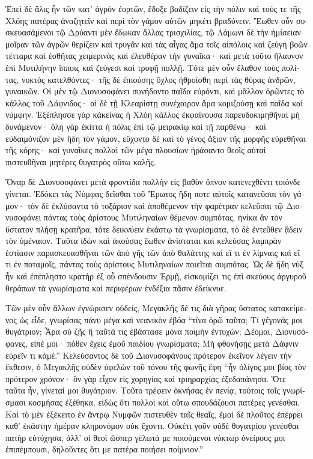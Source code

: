 \documentclass{book}
\begin{document}
\begin{pairs}
\begin{Leftside}
\begin{greek}
  Ἐπεὶ δὲ ἅλις ἦν τῶν κατ’ ἀγρὸν ἑορτῶν, ἔδοξε βαδίζειν εἰς τὴν πόλιν καὶ τούς τε τῆς Χλόης πατέρας ἀναζητεῖν καὶ περὶ τὸν γάμον αὐτῶν μηκέτι βραδύνειν.  Ἕωθεν οὖν συσκευασάμενοι τῷ Δρύαντι μὲν ἔδωκαν ἄλλας τρισχιλίας, τῷ Λάμωνι δὲ τὴν ἡμίσειαν μοῖραν τῶν ἀγρῶν θερίζειν καὶ τρυγᾶν καὶ τὰς αἶγας ἅμα τοῖς αἰπόλοις καὶ ζεύγη βοῶν τέτταρα καὶ ἐσθῆτας χειμερινὰς καὶ ἐλευθέραν τὴν γυναῖκα· καὶ μετὰ τοῦτο ἤλαυνον ἐπὶ Μυτιλήνην ἵπποις καὶ ζεύγεσι καὶ τρυφῇ πολλῇ.  Τότε μὲν οὖν ἔλαθον τοὺς πολίτας, νυκτὸς κατελθόντες· τῆς δὲ ἐπιούσης ὄχλος ἠθροίσθη περὶ τὰς θύρας ἀνδρῶν, γυναικῶν. Οἱ μὲν τῷ Διονυσοφάνει συνήδοντο παῖδα εὑρόντι, καὶ μᾶλλον ὁρῶντες τὸ κάλλος τοῦ Δάφνιδος· αἱ δὲ τῇ Κλεαρίστῃ συνέχαιρον ἅμα κομιζούσῃ καὶ παῖδα καὶ νύμφην.  Ἐξέπλησσε γὰρ κἀκείνας ἡ Χλόη κάλλος ἐκφαίνουσα παρευδοκιμηθῆναι μὴ δυνάμενον· ὅλη γὰρ ἐκίττα ἡ πόλις ἐπὶ τῷ μειρακίῳ καὶ τῇ παρθένῳ· καὶ εὐδαιμόνιζον μὲν ἤδη τὸν γάμον, εὔχοντο δὲ καὶ τὸ γένος ἄξιον τῆς μορφῆς εὑρεθῆναι τῆς κόρης· καὶ γυναῖκες πολλαὶ τῶν μέγα πλουσίων ἠράσαντο θεοῖς αὐταὶ πιστευθῆναι μητέρες θυγατρὸς οὕτω καλῆς.
\pend


  Ὄναρ δὲ Διονυσοφάνει μετὰ φροντίδα πολλὴν εἰς βαθὺν ὕπνον κατενεχθέντι τοιόνδε γίνεται. Ἐδόκει τὰς Νύμφας δεῖσθαι τοῦ Ἔρωτος ἤδη ποτε αὐτοῖς κατανεῦσαι τὸν γάμον· τὸν δὲ ἐκλύσαντα τὸ τοξάριον καὶ ἀποθέμενον τὴν φαρέτραν κελεῦσαι τῷ Διονυσοφάνει πάντας τοὺς ἀρίστους Μυτιληναίων θέμενον συμπότας, ἡνίκα ἂν τὸν ὕστατον πλήσῃ κρατῆρα, τότε δεικνύειν ἑκάστῳ τὰ γνωρίσματα, τὸ δὲ ἐντεῦθεν ᾅδειν τὸν ὑμέναιον.  Ταῦτα ἰδὼν καὶ ἀκούσας ἕωθεν ἀνίσταται καὶ κελεύσας λαμπρὰν ἑστίασιν παρασκευασθῆναι τῶν ἀπὸ γῆς τῶν ἀπὸ θαλάττης καὶ εἴ τι ἐν λίμναις καὶ εἴ τι ἐν ποταμοῖς, πάντας τοὺς ἀρίστους Μυτιληναίων ποιεῖται συμπότας.  Ὡς δὲ ἤδη νὺξ ἦν καὶ ἐπέπληστο κρατὴρ ἐξ οὗ σπένδουσιν Ἑρμῇ, εἰσκομίζει τις ἐπὶ σκεύους ἀργυροῦ θεράπων τὰ γνωρίσματα καὶ περιφέρων ἐνδέξια πᾶσιν ἐδείκνυε.
\pend


  Τῶν μὲν οὖν ἄλλων ἐγνώρισεν οὐδείς, Μεγακλῆς δέ τις διὰ γῆρας ὕστατος κατακείμενος ὡς εἶδε, γνωρίσας πάνυ μέγα καὶ νεανικὸν ἐβόα “τίνα ὁρῶ ταῦτα; Τί γέγονάς μοι θυγάτριον; Ἆρα σὺ ζῇς ἢ ταῦτά τις ἐβάστασε μόνα ποιμὴν ἐντυχών;  Δέομαι, Διονυσόφανες, εἰπέ μοι· πόθεν ἔχεις ἐμοῦ παιδίου γνωρίσματα; Μὴ φθονήσῃς μετὰ Δάφνιν εὑρεῖν τι κἀμέ.” Κελεύσαντος δὲ τοῦ Διονυσοφάνους πρότερον ἐκεῖνον λέγειν τὴν ἔκθεσιν, ὁ Μεγακλῆς οὐδὲν ὑφελὼν τοῦ  τόνου τῆς φωνῆς ἔφη “ἦν ὀλίγος μοι βίος τὸν πρότερον χρόνον· ὃν γὰρ εἶχον εἰς χορηγίας καὶ τριηραρχίας ἐξεδαπάνησα. Ὅτε ταῦτα ἦν, γίνεταί μοι θυγάτριον. Τοῦτο τρέφειν ὀκνήσας ἐν πενίᾳ, τούτοις τοῖς γνωρίσμασι κοσμήσας ἐξέθηκα, εἰδὼς ὅτι πολλοὶ καὶ οὕτω σπουδάζουσι πατέρες γενέσθαι.  Καὶ τὸ μὲν ἐξέκειτο ἐν ἄντρῳ Νυμφῶν πιστευθὲν ταῖς θεαῖς, ἐμοὶ δὲ πλοῦτος ἐπέρρει καθ’ ἑκάστην ἡμέραν κληρονόμον οὐκ ἔχοντι.  Οὐκέτι γοῦν οὐδὲ θυγατρίου γενέσθαι πατὴρ εὐτύχησα, ἀλλ’ οἱ θεοὶ ὥσπερ γέλωτά με ποιούμενοι νύκτωρ ὀνείρους μοι ἐπιπέμπουσι, δηλοῦντες ὅτι με πατέρα ποιήσει ποίμνιον.”
\pend



\end{greek}
\end{Leftside}
\end{pairs}
\end{document}
